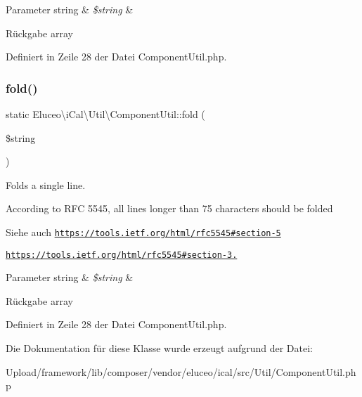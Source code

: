\begin{DoxyParams}[1]{Parameter}
string & {\em \$string} & \\
\hline
\end{DoxyParams}
\begin{DoxyReturn}{Rückgabe}
array 
\end{DoxyReturn}


Definiert in Zeile 28 der Datei Component\+Util.\+php.

\mbox{\label{class_eluceo_1_1i_cal_1_1_util_1_1_component_util_a8b295bedfc690ba2f52a884f52726d22}} 
\subsubsection{\texorpdfstring{fold()}{fold()}\hspace{0.1cm}{\footnotesize\ttfamily [3/3]}}
{\footnotesize\ttfamily static Eluceo\textbackslash{}i\+Cal\textbackslash{}\+Util\textbackslash{}\+Component\+Util\+::fold (\begin{DoxyParamCaption}\item[{}]{\$string }\end{DoxyParamCaption})\hspace{0.3cm}{\ttfamily [static]}}

Folds a single line.

According to R\+FC 5545, all lines longer than 75 characters should be folded

\begin{DoxySeeAlso}{Siehe auch}
\href{https://tools.ietf.org/html/rfc5545#section-5}{\tt https\+://tools.\+ietf.\+org/html/rfc5545\#section-\/5} 

\href{https://tools.ietf.org/html/rfc5545#section-3.1}{\tt https\+://tools.\+ietf.\+org/html/rfc5545\#section-\/3.}
\end{DoxySeeAlso}

\begin{DoxyParams}[1]{Parameter}
string & {\em \$string} & \\
\hline
\end{DoxyParams}
\begin{DoxyReturn}{Rückgabe}
array 
\end{DoxyReturn}


Definiert in Zeile 28 der Datei Component\+Util.\+php.



Die Dokumentation für diese Klasse wurde erzeugt aufgrund der Datei\+:\begin{DoxyCompactItemize}
\item 
Upload/framework/lib/composer/vendor/eluceo/ical/src/\+Util/Component\+Util.\+php\end{DoxyCompactItemize}
